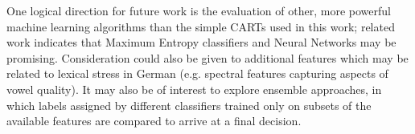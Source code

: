 \documentclass[a4paper]{article}
\begin{document}

	One logical direction for future work is the evaluation of other, more powerful machine learning algorithms than the simple CARTs used in this work; related work indicates that Maximum Entropy classifiers \cite{Kim2011} and Neural Networks \cite{Shahin2012a} may be promising. Consideration could also be given to additional features which may be related to lexical stress in German (e.g. spectral features capturing aspects of vowel quality). 
	It may also be of interest to explore ensemble approaches,
	 in which labels assigned by different classifiers trained only on subsets of the available features are compared to arrive at a final decision.


  



  \eightpt
  

  
\end{document}

